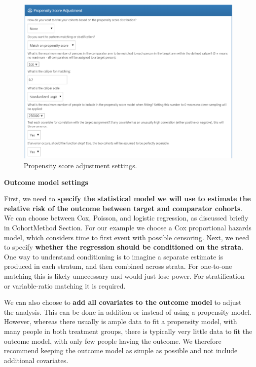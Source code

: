 \documentclass[]{book}
\begin{document}
\begin{figure}

{\centering \includegraphics[width=1\linewidth]{images/PopulationLevelEstimation/psSettings} 

}

\caption{Propensity score adjustment settings.}\label{fig:psSettings}
\end{figure}

\textbf{Outcome model settings}

First, we need to \textbf{specify the statistical model we will use to estimate the relative risk of the outcome between target and comparator cohorts}. We can choose between Cox, Poisson, and logistic regression, as discussed briefly in CohortMethod Section. For our example we choose a Cox proportional hazards model, which considers time to first event with possible censoring. Next, we need to specify \textbf{whether the regression should be conditioned on the strata}. One way to understand conditioning is to imagine a separate estimate is produced in each stratum, and then combined across strata. For one-to-one matching this is likely unnecessary and would just lose power. For stratification or variable-ratio matching it is required.  

We can also choose to \textbf{add all covariates to the outcome model} to adjust the analysis. This can be done in addition or instead of using a propensity model. However, whereas there usually is ample data to fit a propensity model, with many people in both treatment groups, there is typically very little data to fit the outcome model, with only few people having the outcome. We therefore recommend keeping the outcome model as simple as possible and not include additional covariates.
\end{document}
